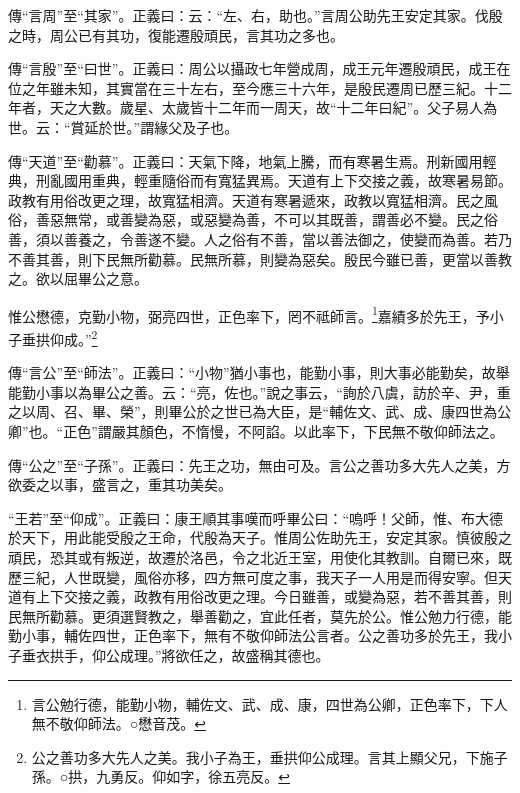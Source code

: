 {\noindent\zhuan{}\fzbyks 傳“言周”至“其家”。正義曰：云：“左、右，助也。”言周公助先王安定其家。伐殷之時，周公已有其功，復能遷殷頑民，言其功之多也。 \par}

{\noindent\zhuan{}\fzbyks 傳“言殷”至“曰世”。正義曰：周公以攝政七年營成周，成王元年遷殷頑民，成王在位之年雖未知，其實當在三十左右，至今應三十六年，是殷民遷周已歷三紀。十二年者，天之大數。歲星、太歲皆十二年而一周天，故“十二年曰紀”。父子易人為世。云：“賞延於世。”謂緣父及子也。 \par}

{\noindent\zhuan{}\fzbyks 傳“天道”至“勸慕”。正義曰：天氣下降，地氣上騰，而有寒暑生焉。刑新國用輕典，刑亂國用重典，輕重隨俗而有寬猛異焉。天道有上下交接之義，故寒暑易節。政教有用俗改更之理，故寬猛相濟。天道有寒暑遞來，政教以寬猛相濟。民之風俗，善惡無常，或善變為惡，或惡變為善，不可以其既善，謂善必不變。民之俗善，須以善養之，令善遂不變。人之俗有不善，當以善法御之，使變而為善。若乃不善其善，則下民無所勸慕。民無所慕，則變為惡矣。殷民今雖已善，更當以善教之。欲以屈畢公之意。 \par}

惟公懋德，克勤小物，弼亮四世，正色率下，罔不祗師言。\footnote{言公勉行德，能勤小物，輔佐文、武、成、康，四世為公卿，正色率下，下人無不敬仰師法。○懋音茂。}嘉績多於先王，予小子垂拱仰成。”\footnote{公之善功多大先人之美。我小子為王，垂拱仰公成理。言其上顯父兄，下施子孫。○拱，九勇反。仰如字，徐五亮反。}

{\noindent\zhuan{}\fzbyks 傳“言公”至“師法”。正義曰：“小物”猶小事也，能勤小事，則大事必能勤矣，故舉能勤小事以為畢公之善。云：“亮，佐也。”說之事云，“詢於八虞，訪於辛、尹，重之以周、召、畢、榮”，則畢公於之世已為大臣，是“輔佐文、武、成、康四世為公卿”也。“正色”謂嚴其顏色，不惰慢，不阿諂。以此率下，下民無不敬仰師法之。 \par}

{\noindent\zhuan{}\fzbyks 傳“公之”至“子孫”。正義曰：先王之功，無由可及。言公之善功多大先人之美，方欲委之以事，盛言之，重其功美矣。 \par}

{\noindent\shu{}\fzkt “王若”至“仰成”。正義曰：康王順其事嘆而呼畢公曰：“嗚呼！父師，惟、布大德於天下，用此能受殷之王命，代殷為天子。惟周公佐助先王，安定其家。慎彼殷之頑民，恐其或有叛逆，故遷於洛邑，令之北近王室，用使化其教訓。自爾已來，既歷三紀，人世既變，風俗亦移，四方無可度之事，我天子一人用是而得安寧。但天道有上下交接之義，政教有用俗改更之理。今日雖善，或變為惡，若不善其善，則民無所勸慕。更須選賢教之，舉善勸之，宜此任者，莫先於公。惟公勉力行德，能勤小事，輔佐四世，正色率下，無有不敬仰師法公言者。公之善功多於先王，我小子垂衣拱手，仰公成理。”將欲任之，故盛稱其德也。 \par}

